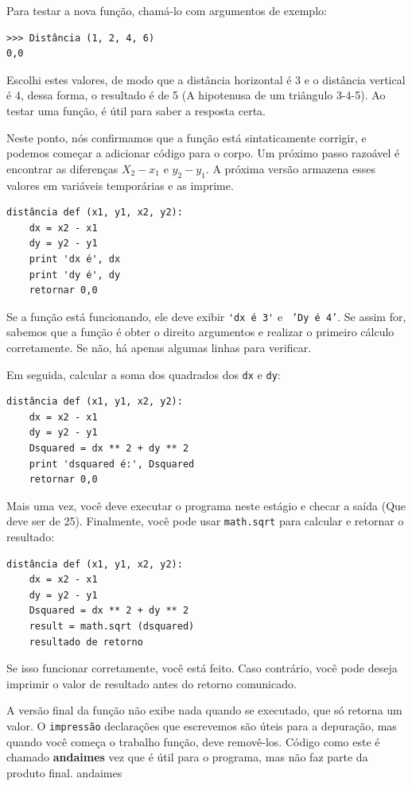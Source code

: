 \documentclass[10pt]{book}
\begin{document}
\begin{exercise}
{{{Para testar a nova função, chamá-lo com argumentos de exemplo:

\begin{verbatim}
>>> Distância (1, 2, 4, 6)
0,0
\end{verbatim}
%
Escolhi estes valores, de modo que a distância horizontal é 3 e o
distância vertical é 4, dessa forma, o resultado é de 5
(A hipotenusa de um triângulo 3-4-5). Ao testar uma função, é
útil para saber a resposta certa.

Neste ponto, nós confirmamos que a função está sintaticamente
corrigir, e podemos começar a adicionar código para o corpo.
Um próximo passo razoável é encontrar as diferenças
$ X_2 - x_1 $ e $ y_2 - y_1 $. A próxima versão armazena esses valores em
variáveis ​​temporárias e as imprime.

\begin{verbatim}
distância def (x1, y1, x2, y2):
    dx = x2 - x1
    dy = y2 - y1
    print 'dx é', dx
    print 'dy é', dy
    retornar 0,0
\end{verbatim}
%
Se a função está funcionando, ele deve exibir \verb "'dx é 3'" e {\tt
'Dy é 4'}. Se assim for, sabemos que a função é obter o direito
argumentos e realizar o primeiro cálculo corretamente. Se não,
há apenas algumas linhas para verificar.

Em seguida, calcular a soma dos quadrados dos {\tt dx} e {\tt dy}:

\begin{verbatim}
distância def (x1, y1, x2, y2):
    dx = x2 - x1
    dy = y2 - y1
    Dsquared = dx ** 2 + dy ** 2
    print 'dsquared é:', Dsquared
    retornar 0,0
\end{verbatim}
%
Mais uma vez, você deve executar o programa neste estágio e checar a saída
(Que deve ser de 25).
Finalmente, você pode usar {\tt math.sqrt} para calcular e retornar o resultado:

\begin{verbatim}
distância def (x1, y1, x2, y2):
    dx = x2 - x1
    dy = y2 - y1
    Dsquared = dx ** 2 + dy ** 2
    result = math.sqrt (dsquared)
    resultado de retorno
\end{verbatim}
%
Se isso funcionar corretamente, você está feito. Caso contrário, você pode
deseja imprimir o valor de {resultado \tt} antes do retorno
comunicado.

A versão final da função não exibe nada quando se
executado, que só retorna um valor. O {\tt impressão} declarações que escrevemos
são úteis para a depuração, mas quando você começa o trabalho função,
deve removê-los. Código como este é chamado {\bf andaimes}
vez que é útil para o programa, mas não faz parte da
produto final.
\index{} andaimes

}}}
\end{exercise}
\end{document}
